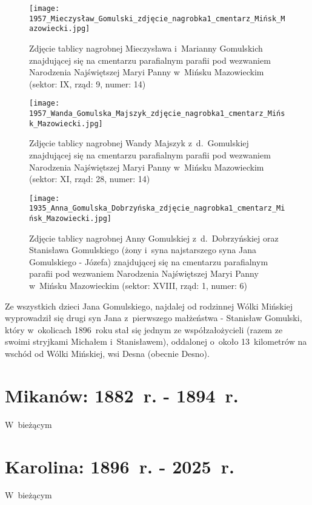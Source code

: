 \begin{figure}[!ht]
    \vspace*{0.4cm}
    \centering \texttt{[image: 
        1957\_Mieczysław\_Gomulski\_zdjęcie\_nagrobka1\_cmentarz\_Mińsk\_Mazowiecki.jpg]}
    \captionsetup{format=hang}
    \caption{Zdjęcie tablicy nagrobnej Mieczysława i~Marianny Gomulskich
    znajdującej się na cmentarzu parafialnym parafii pod wezwaniem Narodzenia
    Najświętszej Maryi Panny w~Mińsku Mazowieckim (sektor: IX, rząd: 9,
    numer: 14)}
    \label{fig:mgomulski_1957}
\end{figure}

\begin{figure}[!ht]
    \vspace*{0.4cm}
    \centering \texttt{[image: 
        1957\_Wanda\_Gomulska\_Majszyk\_zdjęcie\_nagrobka1\_cmentarz\_Mińsk\_Mazowiecki.jpg]}
    \captionsetup{format=hang}
    \caption{Zdjęcie tablicy nagrobnej Wandy Majszyk z~d.~Gomulskiej
    znajdującej się na cmentarzu parafialnym parafii pod wezwaniem Narodzenia
    Najświętszej Maryi Panny w~Mińsku Mazowieckim (sektor: XI, rząd: 28,
    numer: 14)}
    \label{fig:wgomulska_1957}
\end{figure}

\begin{figure}[!ht]
    \vspace*{0.4cm}
    \centering \texttt{[image: 
        1935\_Anna\_Gomulska\_Dobrzyńska\_zdjęcie\_nagrobka1\_cmentarz\_Mińsk\_Mazowiecki.jpg]}
    \captionsetup{format=hang}
    \caption{Zdjęcie tablicy nagrobnej Anny Gomulskiej z~d.~Dobrzyńskiej oraz
    Stanisława Gomulskiego (żony i~syna najstarszego syna Jana Gomulskiego -
    Józefa) znajdującej się na cmentarzu parafialnym parafii pod wezwaniem
    Narodzenia Najświętszej Maryi Panny w~Mińsku Mazowieckim (sektor: XVIII,
    rząd: 1, numer: 6)}
    \label{fig:agomulska_1935}
\end{figure}

Ze wszystkich dzieci Jana Gomulskiego, najdalej od rodzinnej Wólki Mińskiej
wyprowadził się drugi syn Jana z~pierwszego małżeństwa - Stanisław Gomulski,
który w~okolicach 1896~roku stał się jednym ze współzałożycieli (razem ze
swoimi stryjkami Michałem i~Stanisławem), oddalonej o~około 13~kilometrów na
wschód od Wólki Mińskiej, wsi Desna (obecnie Desno).

\newpage
\ifodd\value{page}\hbox{}\newpage\fi



\section{Mikanów: 1882~r. - 1894~r.}

W~bieżącym


\newpage
\ifodd\value{page}\hbox{}\newpage\fi



\section{Karolina: 1896~r. - 2025~r.}

W~bieżącym
